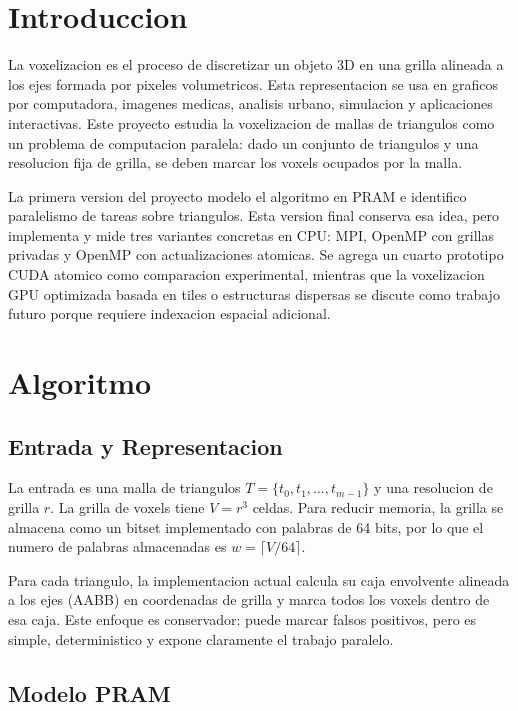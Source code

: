 \documentclass[conference]{IEEEtran}
\begin{document}
\section{Introduccion}

La voxelizacion es el proceso de discretizar un objeto 3D en una grilla alineada
a los ejes formada por pixeles volumetricos. Esta representacion se usa en
graficos por computadora, imagenes medicas, analisis urbano, simulacion y
aplicaciones interactivas. Este proyecto estudia la voxelizacion de mallas de
triangulos como un problema de computacion paralela: dado un conjunto de
triangulos y una resolucion fija de grilla, se deben marcar los voxels ocupados
por la malla.

La primera version del proyecto modelo el algoritmo en PRAM e identifico
paralelismo de tareas sobre triangulos. Esta version final conserva esa idea,
pero implementa y mide tres variantes concretas en CPU: MPI, OpenMP con grillas
privadas y OpenMP con actualizaciones atomicas. Se agrega un cuarto prototipo
CUDA atomico como comparacion experimental, mientras que la voxelizacion GPU
optimizada basada en tiles o estructuras dispersas se discute como trabajo futuro
porque requiere indexacion espacial adicional.

\section{Algoritmo}

\subsection{Entrada y Representacion}

La entrada es una malla de triangulos $T=\{t_0,t_1,\ldots,t_{m-1}\}$ y una
resolucion de grilla $r$. La grilla de voxels tiene $V=r^3$ celdas. Para reducir
memoria, la grilla se almacena como un bitset implementado con palabras de 64
bits, por lo que el numero de palabras almacenadas es $w=\lceil V/64\rceil$.

Para cada triangulo, la implementacion actual calcula su caja envolvente alineada
a los ejes (AABB) en coordenadas de grilla y marca todos los voxels dentro de esa
caja. Este enfoque es conservador: puede marcar falsos positivos, pero es simple,
deterministico y expone claramente el trabajo paralelo.

\subsection{Modelo PRAM}
\end{document}
